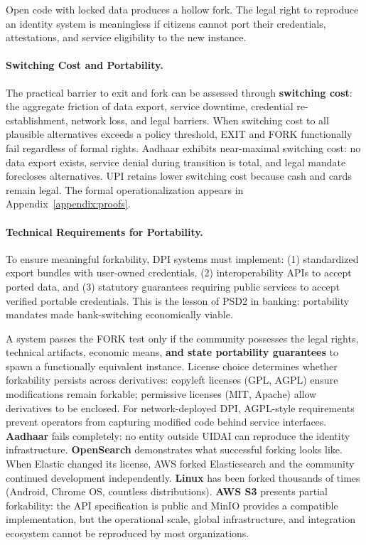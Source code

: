\documentclass{article}
\begin{document}
Open code with locked data produces a hollow fork. The legal right to reproduce an identity system is meaningless if citizens cannot port their credentials, attestations, and service eligibility to the new instance.

\paragraph{Switching Cost and Portability.} The practical barrier to exit and fork can be assessed through \textbf{switching cost}: the aggregate friction of data export, service downtime, credential re-establishment, network loss, and legal barriers. When switching cost to all plausible alternatives exceeds a policy threshold, EXIT and FORK functionally fail regardless of formal rights. Aadhaar exhibits near-maximal switching cost: no data export exists, service denial during transition is total, and legal mandate forecloses alternatives. UPI retains lower switching cost because cash and cards remain legal. The formal operationalization appears in Appendix~\ref{appendix:proofs}.

\paragraph{Technical Requirements for Portability.} To ensure meaningful forkability, DPI systems must implement: (1) standardized export bundles with user-owned credentials, (2) interoperability APIs to accept ported data, and (3) statutory guarantees requiring public services to accept verified portable credentials. This is the lesson of PSD2 in banking: portability mandates made bank-switching economically viable.

A system passes the FORK test only if the community possesses the legal rights, technical artifacts, economic means, \textbf{and state portability guarantees} to spawn a functionally equivalent instance. License choice determines whether forkability persists across derivatives: copyleft licenses (GPL, AGPL) ensure modifications remain forkable; permissive licenses (MIT, Apache) allow derivatives to be enclosed. For network-deployed DPI, AGPL-style requirements prevent operators from capturing modified code behind service interfaces. \textbf{Aadhaar} fails completely: no entity outside UIDAI can reproduce the identity infrastructure. \textbf{OpenSearch} demonstrates what successful forking looks like. When Elastic changed its license, AWS forked Elasticsearch and the community continued development independently. \textbf{Linux} has been forked thousands of times (Android, Chrome OS, countless distributions). \textbf{AWS S3} presents partial forkability: the API specification is public and MinIO provides a compatible implementation, but the operational scale, global infrastructure, and integration ecosystem cannot be reproduced by most organizations.
\end{document}
